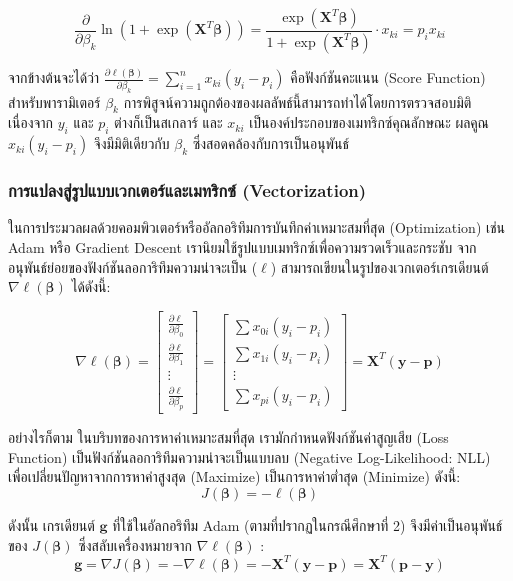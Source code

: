 $$\frac{\partial}{\partial \beta_k} \ln(1 + \exp(\mathbf{X}^{T} \boldsymbol{\beta})) = \frac{\exp(\mathbf{X}^{T} \boldsymbol{\beta})}{1 + \exp(\mathbf{X}^{T} \boldsymbol{\beta})} \cdot x_{ki} = p_i x_{ki}$$


จากข้างต้นจะได้ว่า $\frac{\partial \ell(\boldsymbol{\beta})}{\partial \beta_k}  = \sum_{i=1}^{n} x_{ki}(y_i - p_i)$ คือฟังก์ชันคะแนน (Score Function) สำหรับพารามิเตอร์ $\beta_k$ การพิสูจน์ความถูกต้องของผลลัพธ์นี้สามารถทำได้โดยการตรวจสอบมิติ เนื่องจาก $y_i$ และ $p_i$ ต่างก็เป็นสเกลาร์ และ $x_{ki}$ เป็นองค์ประกอบของเมทริกซ์คุณลักษณะ ผลคูณ $x_{ki}(y_i - p_i)$ จึงมีมิติเดียวกับ $\beta_k$ ซึ่งสอดคล้องกับการเป็นอนุพันธ์

\subsubsection{การแปลงสู่รูปแบบเวกเตอร์และเมทริกซ์ (Vectorization)}

ในการประมวลผลด้วยคอมพิวเตอร์หรืออัลกอริทึมการบันทึกค่าเหมาะสมที่สุด (Optimization) เช่น Adam หรือ Gradient Descent เรานิยมใช้รูปแบบเมทริกซ์เพื่อความรวดเร็วและกระชับ จากอนุพันธ์ย่อยของฟังก์ชันลอการิทึมความน่าจะเป็น ($\ell$) สามารถเขียนในรูปของเวกเตอร์เกรเดียนต์ $\nabla \ell(\boldsymbol{\beta})$ ได้ดังนี้:

$$ \nabla \ell(\boldsymbol{\beta}) = \begin{bmatrix} \frac{\partial \ell}{\partial \beta_0} \\ \frac{\partial \ell}{\partial \beta_1} \\ \vdots \\ \frac{\partial \ell}{\partial \beta_p} \end{bmatrix} = \begin{bmatrix} \sum x_{0i}(y_i - p_i) \\ \sum x_{1i}(y_i - p_i) \\ \vdots \\ \sum x_{pi}(y_i - p_i) \end{bmatrix} = \mathbf{X}^T (\mathbf{y} - \mathbf{p}) $$

อย่างไรก็ตาม ในบริบทของการหาค่าเหมาะสมที่สุด เรามักกำหนดฟังก์ชันค่าสูญเสีย (Loss Function) เป็นฟังก์ชันลอการิทึมความน่าจะเป็นแบบลบ (Negative Log-Likelihood: NLL) เพื่อเปลี่ยนปัญหาจากการหาค่าสูงสุด (Maximize) เป็นการหาค่าต่ำสุด (Minimize) ดังนี้:
$$ J(\boldsymbol{\beta}) = -\ell(\boldsymbol{\beta}) $$

ดังนั้น เกรเดียนต์ $\mathbf{g}$ ที่ใช้ในอัลกอริทึม Adam (ตามที่ปรากฏในกรณีศึกษาที่ 2) จึงมีค่าเป็นอนุพันธ์ของ $J(\boldsymbol{\beta})$ ซึ่งสลับเครื่องหมายจาก $\nabla \ell(\boldsymbol{\beta})$ :
\begin{equation}
    \mathbf{g} = \nabla J(\boldsymbol{\beta}) = -\nabla \ell(\boldsymbol{\beta}) = -\mathbf{X}^T (\mathbf{y} - \mathbf{p}) = \mathbf{X}^T (\mathbf{p} - \mathbf{y})
    \label{eq:vector_gradient}
\end{equation}

